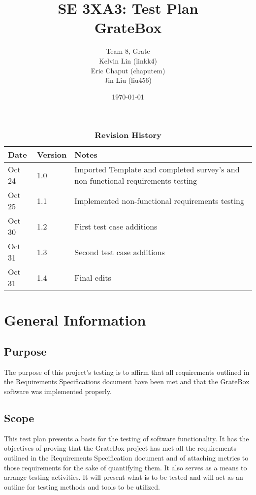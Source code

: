\documentclass[12pt, titlepage]{article}
\title{SE 3XA3: Test Plan\\GrateBox}
\author{Team 8, Grate
		\\ Kelvin Lin (linkk4)
		\\ Eric Chaput (chaputem)
		\\ Jin Liu (liu456)
}
\date{\today}
\begin{document}
\maketitle

\tableofcontents
\listoftables
\listoffigures

\begin{table}[bph]
\caption{\bf Revision History}
\begin{tabularx}{\textwidth}{p{3cm}p{2cm}X}
\toprule {\bf Date} & {\bf Version} & {\bf Notes}\\
\midrule
Oct 24 & 1.0 & Imported Template and completed survey's and non-functional 
requirements  testing\\
Oct 25 & 1.1 & Implemented non-functional requirements testing\\
Oct 30 & 1.2 & First test case additions\\
Oct 31 & 1.3 & Second test case additions\\
Oct 31 & 1.4 & Final edits\\
\bottomrule
\end{tabularx}
\end{table}

\newpage


\section{General Information}

\subsection{Purpose}

The purpose of this project's testing is to affirm that all requirements 
outlined in the Requirements Specifications document have been met and that the 
GrateBox software was implemented properly.

\subsection{Scope}

This test plan presents a basis for the testing of software functionality. It 
has the objectives of proving that the GrateBox project has met all the 
requirements outlined in the Requirements Specification document and of 
attaching metrics to those requirements for the sake of quantifying them. It 
also serves as a means to arrange testing activities. It will present what is to 
be tested and will act as an outline for testing methods and tools to be 
utilized.
\end{document}
